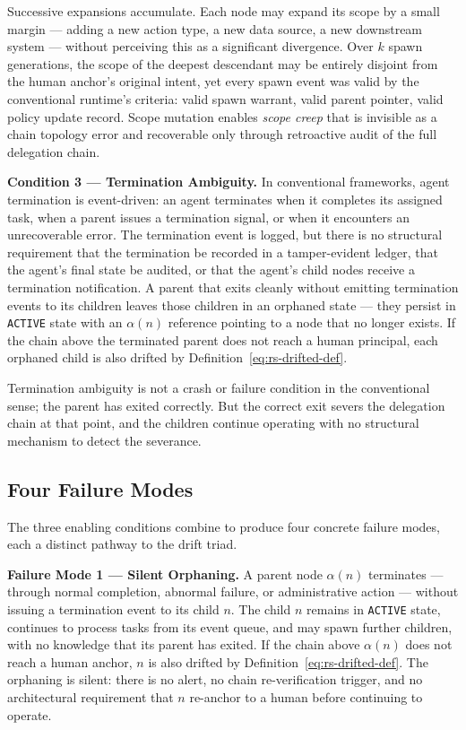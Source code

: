 Successive expansions accumulate. Each node may expand its scope by a small margin — adding a new action type, a new data source, a new downstream system — without perceiving this as a significant divergence. Over $k$ spawn generations, the scope of the deepest descendant may be entirely disjoint from the human anchor's original intent, yet every spawn event was valid by the conventional runtime's criteria: valid spawn warrant, valid parent pointer, valid policy update record. Scope mutation enables \emph{scope creep} that is invisible as a chain topology error and recoverable only through retroactive audit of the full delegation chain.

\medskip
\noindent\textbf{Condition 3 — Termination Ambiguity.}
In conventional frameworks, agent termination is event-driven: an agent terminates when it completes its assigned task, when a parent issues a termination signal, or when it encounters an unrecoverable error. The termination event is logged, but there is no structural requirement that the termination be recorded in a tamper-evident ledger, that the agent's final state be audited, or that the agent's child nodes receive a termination notification. A parent that exits cleanly without emitting termination events to its children leaves those children in an orphaned state — they persist in \texttt{ACTIVE} state with an $\alpha(n)$ reference pointing to a node that no longer exists. If the chain above the terminated parent does not reach a human principal, each orphaned child is also drifted by Definition~\ref{eq:rs-drifted-def}.

Termination ambiguity is not a crash or failure condition in the conventional sense; the parent has exited correctly. But the correct exit severs the delegation chain at that point, and the children continue operating with no structural mechanism to detect the severance.

\subsection{Four Failure Modes}
\label{sec:rs-drift-failure-modes}

The three enabling conditions combine to produce four concrete failure modes, each a distinct pathway to the drift triad.

\medskip
\noindent\textbf{Failure Mode 1 — Silent Orphaning.}
A parent node $\alpha(n)$ terminates — through normal completion, abnormal failure, or administrative action — without issuing a termination event to its child $n$. The child $n$ remains in \texttt{ACTIVE} state, continues to process tasks from its event queue, and may spawn further children, with no knowledge that its parent has exited. If the chain above $\alpha(n)$ does not reach a human anchor, $n$ is also drifted by Definition~\ref{eq:rs-drifted-def}. The orphaning is silent: there is no alert, no chain re-verification trigger, and no architectural requirement that $n$ re-anchor to a human before continuing to operate.

